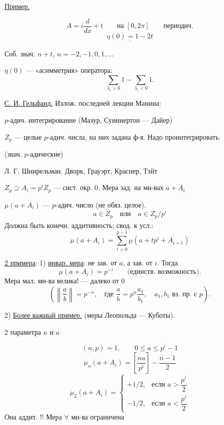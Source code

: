 \uline{Пример.}

\[
 A=i\frac{d}{dx}+t\qquad\text{на }[0,2\pi]\qquad\text{периодич.}
\]
\[
\underline{\eta(0)=1-2t}
\]


Соб. знач. $n+t$, $n=-2,-1,0,1,\ldots$

$\eta(0)$ — «асимметрия» оператора:
\[
\sum_{\lambda_i>0}1-\sum_{\lambda_i<0}1.
\]

\uline{С. И. Гельфанд.} Излож. последней лекции Манина:

$p$-адич. интегрирование (Мазур, Суиннертон — Дайер)




$Z_p$ — целые $p$-адич. числа, на них задана ф-я. Надо проинтегрировать.

(знач. $p$-адические)

 Л. Г. Шнирельман, Дворк, Грауэрт, Краснер, Тэйт

$Z_p\supset A_i=p^iZ_p$ — сист. окр. $0$.
Мера зад. на мн-вах $a+A_i$

$\mu(a+A_i)$ — $p$-адич. число (не обяз. целое).
\[
a\in Z_p\quad\text{или}\quad \underline{a\in Z_p/p^i}
\]
Должна быть конечн. аддитивность; свод. к усл.:
\[
\mu(a+A_i)=\sum_{t=0}^{p-1}\mu(a+tp^i+A_{i+1})
\]

\uline{2 примера}: 1) \uline{инвар. мера}: не зав. от $a$, а зав. от $i$.
Тогда
\[
\mu(a+A_i)=p^{-i}\qquad\text{(единств. возможность).}
\]
Мера мал. мн-ва велика! — далеко от $0$
\[
\left(\left\|\frac ab\right\|=p^{-n},\quad
\text{где }\frac ab=p^n\frac{a_1}{b_1},\quad
a_1,b_1\text{ вз. пр. с }p\right).
\]

2) \uline{Более важный пример.} (меры Леопольда — Куботы).
\begin{flushright}
2 параметра $n$ и $a$
\end{flushright}
\[
(n,p)=1,\qquad 0\le a\le p^i-1
\]
\[
\mu_n(a+A_i)=\left[\frac{na}{p^i}\right]-\frac{n-1}{2}
\]
\[
\mu_2(a+A_i)=
\begin{cases}
+1/2,&\text{если }a>\dfrac{p^i}{2}\\
-1/2,&\text{если }a<\dfrac{p^i}{2}
\end{cases}
\]
Она аддит. !! Мера $\forall$ мн-ва ограничена

